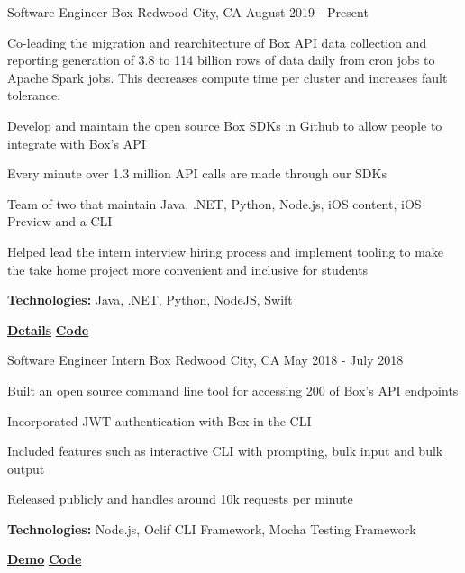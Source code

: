 
\begin{cventries}
  \cventry
    {Software Engineer} %
    {Box} %
    {Redwood City, CA} %
    {August 2019 - Present} %
    {
      \begin{cvitems} %
        \item{Co-leading the migration and rearchitecture of Box API data collection and reporting generation of 3.8 to 114 billion rows of data daily from cron jobs to Apache Spark jobs. This decreases compute time per cluster and increases fault tolerance.}
        \item{Develop and maintain the open source Box SDKs in Github to allow people to integrate with Box's API}
        \item{Every minute over 1.3 million API calls are made through our SDKs}
        \item{Team of two that maintain Java, .NET, Python, Node.js, iOS content, iOS Preview and a CLI}
        \item{Helped lead the intern interview hiring process and implement tooling to make the take home project more convenient and inclusive for students }
        {\setlength \itemindent{-2ex} \itemsep2pt \item[] \textbf{Technologies:} Java, .NET, Python, NodeJS, Swift}
        {\setlength \itemindent{-2ex} \itemsep2pt \item[] 
        \href{https://sujaygarlanka.com/experience.html\#box}{ \faInfoCircle \textbf{ Details}}
        \href{https://github.com/box/sdks}{ \faGithub \textbf{ Code}}}
      \end{cvitems}
    }
    
  \cventry
    {Software Engineer Intern} %
    {Box} %
    {Redwood City, CA} %
    {May 2018 - July 2018} %
    {
      \begin{cvitems} %
        \item{Built an open source command line tool for accessing 200 of Box’s API endpoints}
        \item{Incorporated JWT authentication with Box in the CLI}
        \item{Included features such as interactive CLI with prompting, bulk input and bulk output}
        \item{Released publicly and handles around 10k requests per minute}
        {\setlength \itemindent{-2ex} \itemsep2pt \item[] \textbf{Technologies:} Node.js, Oclif CLI Framework, Mocha Testing Framework}
        {\setlength \itemindent{-2ex} \itemsep2pt \item[]  \href{https://sujaygarlanka.com/experience.html\#internship}{ \faPlayCircle \textbf{ Demo}} \href{https://github.com/box/boxcli}{ \faGithub \textbf{ Code}}}
      \end{cvitems}
    }


\end{cventries}
